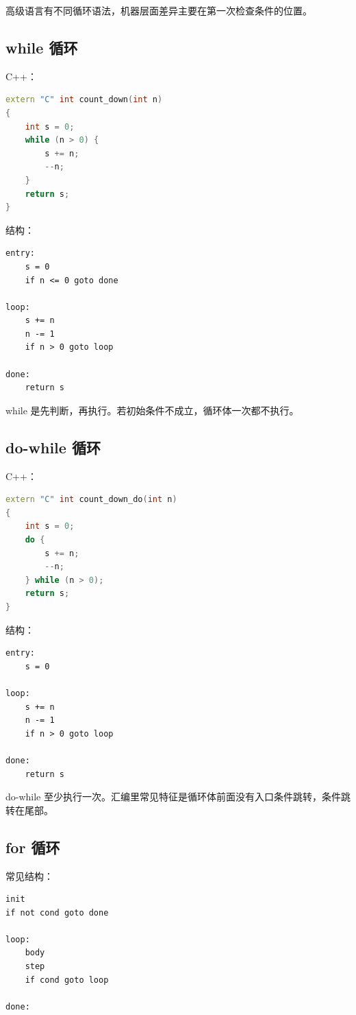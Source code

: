 高级语言有不同循环语法，机器层面差异主要在第一次检查条件的位置。

\subsection{while 循环}

C++：

\begin{lstlisting}[language=C++]
extern "C" int count_down(int n)
{
    int s = 0;
    while (n > 0) {
        s += n;
        --n;
    }
    return s;
}
\end{lstlisting}

结构：

\begin{lstlisting}
entry:
    s = 0
    if n <= 0 goto done

loop:
    s += n
    n -= 1
    if n > 0 goto loop

done:
    return s
\end{lstlisting}

while 是先判断，再执行。若初始条件不成立，循环体一次都不执行。

\subsection{do-while 循环}

C++：

\begin{lstlisting}[language=C++]
extern "C" int count_down_do(int n)
{
    int s = 0;
    do {
        s += n;
        --n;
    } while (n > 0);
    return s;
}
\end{lstlisting}

结构：

\begin{lstlisting}
entry:
    s = 0

loop:
    s += n
    n -= 1
    if n > 0 goto loop

done:
    return s
\end{lstlisting}

do-while 至少执行一次。汇编里常见特征是循环体前面没有入口条件跳转，条件跳转在尾部。

\subsection{for 循环}

 常见结构：

\begin{lstlisting}
init
if not cond goto done

loop:
    body
    step
    if cond goto loop

done:
\end{lstlisting}

